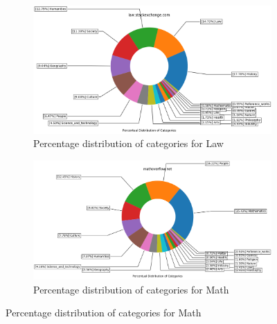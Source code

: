  
\begin{figure}[H]
\ContinuedFloat


    \begin{subfigure}{0.9\textwidth}
    \centering
        \includegraphics[width=1\linewidth]{imgs/percentual-distribution/law_stackexchange_com_donut}
        \caption{Percentage distribution of categories for Law}
        \label{fig:percentage-distribution-law}
    \end{subfigure} 

     \par\bigskip %
    \par\bigskip %
    \begin{subfigure}{0.9\textwidth}
    \centering
        \includegraphics[width=1\linewidth]{imgs/percentual-distribution/mathoverflow_net_donut}
        \caption{Percentage distribution of categories for Math}
        \label{fig:percentage-distribution-math}
    \end{subfigure}%
    

\end{figure}
